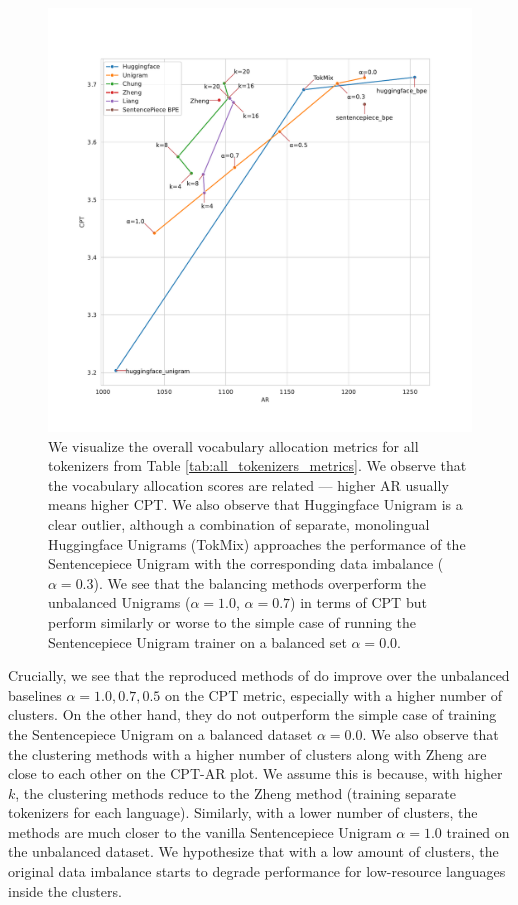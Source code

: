 \begin{figure}
    \centering
    \includegraphics[width=\textwidth]{figures/all_tokenizers_AR_vs_CPT.pdf}
    \caption{We visualize the overall vocabulary allocation metrics for all tokenizers from Table \ref{tab:all_tokenizers_metrics}. We observe that the vocabulary allocation scores are related --- higher AR usually means higher CPT.  We also observe that Huggingface Unigram is a clear outlier, although a combination of separate, monolingual Huggingface Unigrams (TokMix) approaches the performance of the Sentencepiece Unigram with the corresponding data imbalance ($\alpha=0.3$). We see that the balancing methods overperform the unbalanced Unigrams ($\alpha=1.0$, $\alpha=0.7$) in terms of CPT but perform similarly or worse to the simple case of running the Sentencepiece Unigram trainer on a balanced set $\alpha=0.0$.}
    \label{fig:all_tokenizers_AR_vs_CPT}
\end{figure}

Crucially, we see that the reproduced methods of \citet{chung_improving_2020,zheng_allocating_2021,liang_xlm-v_2023} do improve over the unbalanced baselines $\alpha=1.0, 0.7, 0.5$ on the CPT metric, especially with a higher number of clusters. On the other hand, they do not outperform the simple case of training the Sentencepiece Unigram on a balanced dataset $\alpha=0.0$. We also observe that the clustering methods with a higher number of clusters along with Zheng are close to each other on the CPT-AR plot. We assume this is because, with higher $k$, the clustering methods reduce to the Zheng method (training separate tokenizers for each language). Similarly, with a lower number of clusters, the methods are much closer to the vanilla Sentencepiece Unigram $\alpha=1.0$ trained on the unbalanced dataset. We hypothesize that with a low amount of clusters, the original data imbalance starts to degrade performance for low-resource languages inside the clusters.

